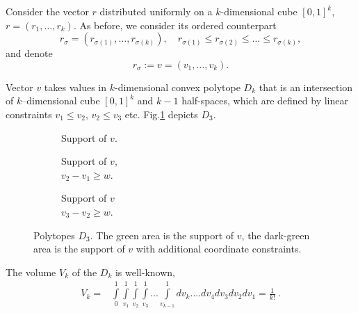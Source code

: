 \documentclass{llncs}
\begin{document}
Consider the vector $r$ distributed uniformly on a $k$-dimensional cube $[0, 1]^{k}$, $r = (r_1, \dots, r_k)$. As before, we consider its ordered counterpart
\[
r_{\sigma} = (r_{\sigma(1)}, \dots, r_{\sigma(k)}), \quad r_{\sigma(1)} \leq r_{\sigma(2)} \leq \dots \leq r_{\sigma(k)},
\]
and denote 
\[
    r_{\sigma} := v = (v_1, \dots, v_k).
\]

Vector $v$ takes values in $k$-dimensional convex polytope $D_k$ that is 
an intersection of $k$--dimensional cube $[0, 1]^{k}$ and 
$k-1$ half-spaces, which are defined by linear constraints $v_1 \le v_2$, $v_2 \le v_3$ etc.
Fig.\ref{fig:polytop} depicts $D_3$. 
\begin{figure}
     \centering
     \begin{subfigure}[b]{0.3\textwidth}
         \centering 
         \caption{Support of $v$.
         \\\hspace{\textwidth} 
        }
         \label{fig:polytop}
     \end{subfigure}
     \begin{subfigure}[b]{0.3\textwidth}
         \centering 
         \caption{Support of $v$, 
         \\\hspace{\textwidth}
         $v_2 - v_1 \ge w$.}
         \label{fig:polytop1}
     \end{subfigure}
     \begin{subfigure}[b]{0.3\textwidth}
         \centering 
         \caption{Support of $v$ \\\hspace{\textwidth}$v_3 - v_2 \ge w$.}
         \label{fig:polytop2}
     \end{subfigure}
    \caption{Polytopes $D_3$. The green area is the support of $v$, the dark-green area is the support of $v$ with additional coordinate constraints.}
\end{figure}

The volume $V_k$ of the $D_k$ is well-known,
\begin{eqnarray*}
V_k = &\displaystyle \int\limits_0^1\int\limits_{v_1}^1\int\limits_{v_2}^1\int\limits_{v_3}^1...\int\limits_{v_{k-1}}^1 dv_k....dv_4 dv_3 dv_2 dv_1 =  \frac{1}{k!}~.
\end{eqnarray*}
\end{document}

